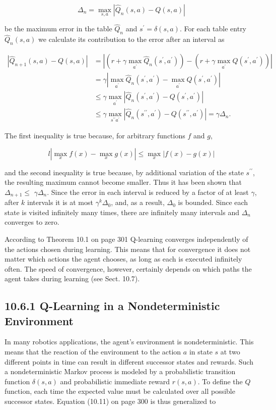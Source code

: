 \documentclass[10pt]{article}
\begin{document}
$$
\Delta_{n}=\max _{s, a}\left|\hat{Q}_{n}(s, a)-Q(s, a)\right|
$$

be the maximum error in the table $\hat{Q}_{n}$ and $s^{\prime}=\delta(s, a)$. For each table entry $\hat{Q}_{n}(s, a)$ we calculate its contribution to the error after an interval as


$$
\begin{aligned}
\left|\hat{Q}_{n+1}(s, a)-Q(s, a)\right| & =\left|\left(r+\gamma \max _{a^{\prime}} \hat{Q}_{n}\left(s^{\prime}, a^{\prime}\right)\right)-\left(r+\gamma \max _{a^{\prime}} Q\left(s^{\prime}, a^{\prime}\right)\right)\right| \\
& =\gamma\left|\max _{a^{\prime}} \hat{Q}_{n}\left(s^{\prime}, a^{\prime}\right)-\max _{a^{\prime}} Q\left(s^{\prime}, a^{\prime}\right)\right| \\
& \leq \gamma \max _{a^{\prime}}\left|\hat{Q}_{n}\left(s^{\prime}, a^{\prime}\right)-Q\left(s^{\prime}, a^{\prime}\right)\right| \\
& \leq \gamma \max _{s^{\prime \prime} a^{\prime}}\left|\hat{Q}_{n}\left(s^{\prime \prime}, a^{\prime}\right)-Q\left(s^{\prime \prime}, a^{\prime}\right)\right|=\gamma \Delta_{n} .
\end{aligned}
$$

The first inequality is true because, for arbitrary functions $f$ and $g$,

$$
l\left|\max _{x} f(x)-\max _{x} g(x)\right| \leq \max _{x}|f(x)-g(x)|
$$

and the second inequality is true because, by additional variation of the state $s^{\prime \prime}$, the resulting maximum cannot become smaller. Thus it has been shown that $\Delta_{n+1} \leq$ $\gamma \Delta_{n}$. Since the error in each interval is reduced by a factor of at least $\gamma$, after $k$ intervals it is at most $\gamma^{k} \Delta_{0}$, and, as a result, $\Delta_{0}$ is bounded. Since each state is visited infinitely many times, there are infinitely many intervals and $\Delta_{n}$ converges to zero.

According to Theorem 10.1 on page 301 Q-learning converges independently of the actions chosen during learning. This means that for convergence it does not matter which actions the agent chooses, as long as each is executed infinitely often. The speed of convergence, however, certainly depends on which paths the agent takes during learning (see Sect. 10.7).

\subsection*{10.6.1 Q-Learning in a Nondeterministic Environment}
In many robotics applications, the agent's environment is nondeterministic. This means that the reaction of the environment to the action $a$ in state $s$ at two different points in time can result in different successor states and rewards. Such a nondeterministic Markov process is modeled by a probabilistic transition function $\delta(s, a)$ and probabilistic immediate reward $r(s, a)$. To define the $Q$ function, each time the expected value must be calculated over all possible successor states. Equation (10.11) on page 300 is thus generalized to
\end{document}
